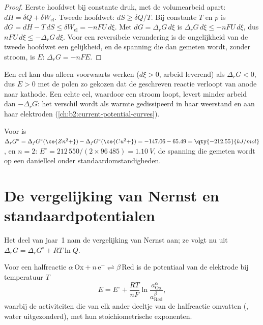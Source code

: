 \begin{proof}
Eerste hoofdwet bij constante druk, met de volumearbeid apart:
$dH = \delta Q + \delta W_{\text{el}}$. Tweede hoofdwet: $dS \geq \delta Q/T$. Bij
constante $T$ en $p$ is $dG = dH - T\,dS \leq \delta W_{\text{el}} = -nFU\,d\xi$.
Met $dG = \Delta_r G\,d\xi$ is $\Delta_r G\,d\xi \leq -nFU\,d\xi$, dus
$nFU\,d\xi \leq -\Delta_r G\,d\xi$. Voor een reversibele verandering is de ongelijkheid
van de tweede hoofdwet een gelijkheid, en de spanning die dan gemeten wordt, zonder
stroom, is $E$: $\Delta_r G = -nFE$.
\end{proof}

Een cel kan dus alleen voorwaarts werken ($d\xi > 0$, arbeid leverend) als $\Delta_r G <
0$, dus $E > 0$ met de polen zo gekozen dat de geschreven reactie verloopt
van anode naar kathode. Een echte cel, waardoor een stroom loopt, levert
minder arbeid dan $-\Delta_r G$: het verschil wordt als warmte gedissipeerd in haar
weerstand en aan haar elektroden (\cref{ch:b2:current-potential-curves}).

\begin{example}[De daniellcel]\label{ex:b2:cell-thermodynamics:daniell}
Voor  is $\Delta_r G^\circ = \Delta_f G^\circ(\ce{Zn^2+}) -
\Delta_f G^\circ(\ce{Cu^2+}) = -147.06 - 65.49 = \qty{-212.55}{kJ/mol}$, en $n = 2$:
$E^\circ = 212\,550/(2 \times 96\,485) = \qty{1.10}{V}$, de spanning die gemeten wordt op een
daniellcel onder standaardomstandigheden.
\end{example}

\section{De vergelijking van Nernst en standaardpotentialen}

Het deel van jaar~1 nam de vergelijking van Nernst aan; ze volgt nu uit
$\Delta_r G = \Delta_r G^\circ + RT\ln Q$.

\begin{theorem}\label{thm:b2:cell-thermodynamics:nernst-derived}
Voor een halfreactie $\alpha\,\mathrm{Ox} + n\,\mathrm e^- \rightleftharpoons
\beta\,\mathrm{Red}$ is de potentiaal van de elektrode bij temperatuur $T$
\[
  E = E^\circ + \frac{RT}{nF}\ln\frac{a_{\mathrm{Ox}}^{\alpha}}{a_{\mathrm{Red}}^{\beta}} ,
\]
waarbij de activiteiten die van elk ander deeltje van de
halfreactie omvatten (, water uitgezonderd), met hun stoichiometrische exponenten.
\end{theorem}

